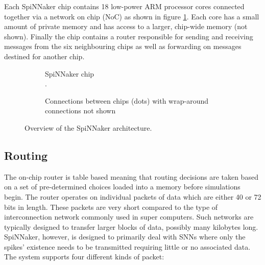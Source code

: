 			Each SpiNNaker chip contains 18 low-power ARM processor cores connected
			together via a network on chip (NoC) as shown in figure
			\ref{fig:spinnaker-chip}. Each core has a small amount of private memory
			and has access to a larger, chip-wide memory (not shown). Finally the chip
			contains a router responsible for sending and receiving messages from the
			six neighbouring chips as well as forwarding on messages destined for
			another chip.
			
			
			\begin{figure}
				\center
				\begin{subfigure}[b]{0.49\textwidth}
					\center
					
					\caption{SpiNNaker chip\\\color{white}.}
					\label{fig:spinnaker-chip}
				\end{subfigure}
				\begin{subfigure}[b]{0.49\textwidth}
					\center
					
					\caption{Connections between chips (dots) with wrap-around
					connections not shown}
					\label{fig:spinnaker-chips}
				\end{subfigure}
				
				\caption{Overview of the SpiNNaker architecture.}
				\label{fig:spinnaker-architecture}
			\end{figure}
		
		\subsection{Routing}
			
			
			The on-chip router is table based meaning that routing decisions are taken
			based on a set of pre-determined choices loaded into a memory before
			simulations begin. The router operates on individual packets of data which
			are either 40 or 72 bits in length. These packets are very short compared
			to the type of interconnection network commonly used in super computers.
			Such networks are typically designed to transfer larger blocks of data,
			possibly many kilobytes long. SpiNNaker, however, is designed to primarily
			deal with SNNs where only the spikes' existence needs to be transmitted
			requiring little or no associated data.  The system supports four
			different kinds of packet:
			
